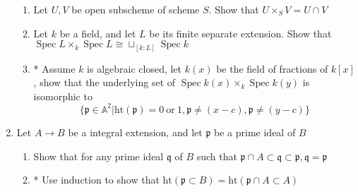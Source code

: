 \documentclass[a4paper,11pt]{article}
\def\bb#1{\mathbb{#1}}
\DeclareMathOperator{\Spec}{Spec}
\begin{document}
\begin{enumerate}[1.]
\begin{enumerate}
    \item Let $U,V$ be open subscheme of scheme $S$. Show that $U\times_S V=U\cap V$
    \item Let $k$ be a field, and let $L$ be its finite separate extension. Show that $\Spec L \times_k \Spec L \cong \sqcup_{[k:L]}\Spec k$
    \item* Assume $k$ is algebraic closed, let $k(x)$ be the field of fractions of $k[x]$, show that the underlying set of
    $\Spec k(x) \times_k \Spec k(y)$ is isomorphic to
    \[ \{\mathfrak{p}\in\bb{A}^2| \mathrm{ht}(\mathfrak{p})=0\ \mathrm{or}\ 1, \mathfrak{p}\neq (x-c),\mathfrak{p}\neq(y-c)\}\]
\end{enumerate}
\item Let $A\to B$ be a integral extension, and let $\mathfrak{p}$ be a prime ideal of $B$
\begin{enumerate}
    \item Show that for any prime ideal $\mathfrak{q}$ of $B$ such that $\mathfrak{p}\cap A\subset\mathfrak{q}\subset \mathfrak{p}, \mathfrak{q}= \mathfrak{p}$
    \item* Use induction to show that $\mathrm{ht}(\mathfrak{p}\subset B)=\mathrm{ht}(\mathfrak{p}\cap A\subset A)$
\end{enumerate}

\end{enumerate}
\end{document}

